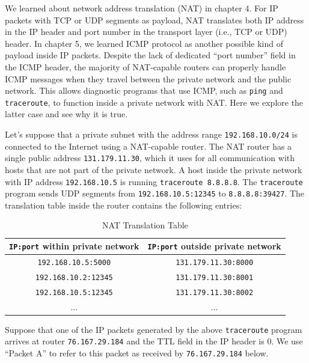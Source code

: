 \documentclass{report}
\begin{document}
\newpage
\begin{problem}
We learned about network address translation (NAT) in chapter 4. For IP packets with TCP or UDP segments as payload, NAT translates both IP address in the IP header and port number in the transport layer (i.e., TCP or UDP) header. In chapter 5, we learned ICMP protocol as another possible kind of payload inside IP packets. Despite the lack of dedicated ``port number'' field in the ICMP header, the majority of NAT-capable routers can properly handle ICMP messages when they travel between the private network and the public network. This allows diagnostic programs that use ICMP, such as \texttt{ping} and \texttt{traceroute}, to function inside a private network with NAT. Here we explore the latter case and see why it is true.

Let's suppose that a private subnet with the address range \texttt{192.168.10.0/24} is connected to the Internet using a NAT-capable router. The NAT router has a single public address \texttt{131.179.11.30}, which it uses for all communication with
hosts that are not part of the private network. A host inside the private network with IP address \texttt{192.168.10.5} is running \texttt{traceroute 8.8.8.8}. The \texttt{traceroute} program sends UDP segments from \texttt{192.168.10.5:12345} to \texttt{8.8.8.8:39427}. The translation table inside the router contains the following entries:

\begin{table}[H]
  \caption{NAT Translation Table}
  \label{tbl:nat}
  \centering \smallskip
  \begin{tabular*}{0.7\textwidth}{c c}
    \toprule
    \texttt{IP:port} within private network &  \texttt{IP:port} outside private network \\
    \midrule
    \texttt{192.168.10.5:5000} & \texttt{131.179.11.30:8000} \\
    \midrule
    \texttt{192.168.10.2:12345} & \texttt{131.179.11.30:8001} \\
    \midrule
    \texttt{192.168.10.5:12345} & \texttt{131.179.11.30:8002} \\
    \midrule
    $\ldots$ & $\ldots$ \\
    \bottomrule
  \end{tabular*}
\end{table}

Suppose that one of the IP packets generated by the above \texttt{traceroute} program arrives at router \texttt{76.167.29.184} and the TTL field in the IP header is 0. We use ``Packet A'' to refer to this packet as received by \texttt{76.167.29.184} below.


\end{problem}
\end{document}
